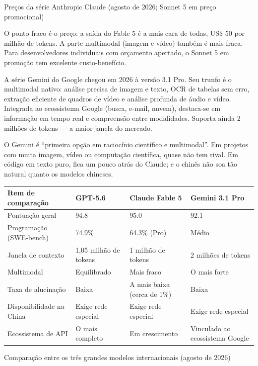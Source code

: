 \begin{center}\small\color{gray}Preços da série Anthropic Claude (agosto de 2026; Sonnet 5 em preço promocional)\end{center}

O ponto fraco é o preço: a saída do Fable 5 é a mais cara de todas, US\$ 50 por milhão de tokens. A parte multimodal (imagem e vídeo) também é mais fraca. Para desenvolvedores individuais com orçamento apertado, o Sonnet 5 em promoção tem excelente custo-benefício.


A série Gemini do Google chegou em 2026 à versão 3.1 Pro. Seu trunfo é o multimodal nativo: análise precisa de imagem e texto, OCR de tabelas sem erro, extração eficiente de quadros de vídeo e análise profunda de áudio e vídeo. Integrada ao ecossistema Google (busca, e-mail, nuvem), destaca-se em informação em tempo real e compreensão entre modalidades. Suporta ainda 2 milhões de tokens — a maior janela do mercado.

O Gemini é “primeira opção em raciocínio científico e multimodal”. Em projetos com muita imagem, vídeo ou computação científica, quase não tem rival. Em código em texto puro, fica um pouco atrás do Claude; e o chinês não soa tão natural quanto os modelos chineses.

\begin{center}
\begin{tabularx}{\linewidth}{|X|X|X|X|}
\hline
\textbf{Item de comparação} & \textbf{GPT-5.6} & \textbf{Claude Fable 5} & \textbf{Gemini 3.1 Pro} \tabularnewline
\hline
Pontuação geral & 94.8 & 95.0 & 92.1 \tabularnewline
Programação (SWE-bench) & 74.9\% & 64.3\% (Pro) & Médio \tabularnewline
Janela de contexto & 1,05 milhão de tokens & 1 milhão de tokens & 2 milhões de tokens \tabularnewline
Multimodal & Equilibrado & Mais fraco & O mais forte \tabularnewline
Taxa de alucinação & Baixa & A mais baixa (cerca de 1\%) & Baixa \tabularnewline
Disponibilidade na China & Exige rede especial & Exige rede especial & Exige rede especial \tabularnewline
Ecossistema de API & O mais completo & Em crescimento & Vinculado ao ecossistema Google \tabularnewline
\hline
\end{tabularx}
\end{center}

\begin{center}\small\color{gray}Comparação entre os três grandes modelos internacionais (agosto de 2026)\end{center}

